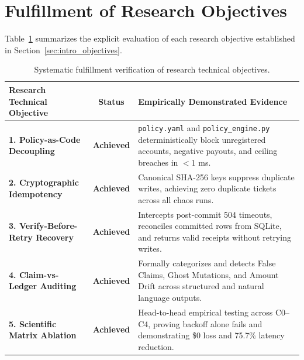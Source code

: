 \section{Fulfillment of Research Objectives}
\label{sec:concl_objectives}
Table~\ref{tab:concl_objectives} summarizes the explicit evaluation of each research objective established in Section~\ref{sec:intro_objectives}.

\begin{table}[H]
\centering
\small
\renewcommand{\arraystretch}{1.25}
\begin{tabularx}{\textwidth}{p{4.5cm}cp{6.5cm}}
\toprule
\textbf{Research Technical Objective} & \textbf{Status} & \textbf{Empirically Demonstrated Evidence} \\
\midrule
\textbf{1. Policy-as-Code Decoupling} & \textbf{Achieved} & \texttt{policy.yaml} and \texttt{policy\_engine.py} deterministically block unregistered accounts, negative payouts, and ceiling breaches in $<1$ ms. \\
\textbf{2. Cryptographic Idempotency} & \textbf{Achieved} & Canonical SHA-256 keys suppress duplicate writes, achieving zero duplicate tickets across all chaos runs. \\
\textbf{3. Verify-Before-Retry Recovery} & \textbf{Achieved} & Intercepts post-commit 504 timeouts, reconciles committed rows from SQLite, and returns valid receipts without retrying writes. \\
\textbf{4. Claim-vs-Ledger Auditing} & \textbf{Achieved} & Formally categorizes and detects False Claims, Ghost Mutations, and Amount Drift across structured and natural language outputs. \\
\textbf{5. Scientific Matrix Ablation} & \textbf{Achieved} & Head-to-head empirical testing across C0–C4, proving backoff alone fails and demonstrating \$0 loss and 75.7\% latency reduction. \\
\bottomrule
\end{tabularx}
\caption{Systematic fulfillment verification of research technical objectives.}
\label{tab:concl_objectives}
\end{table}

